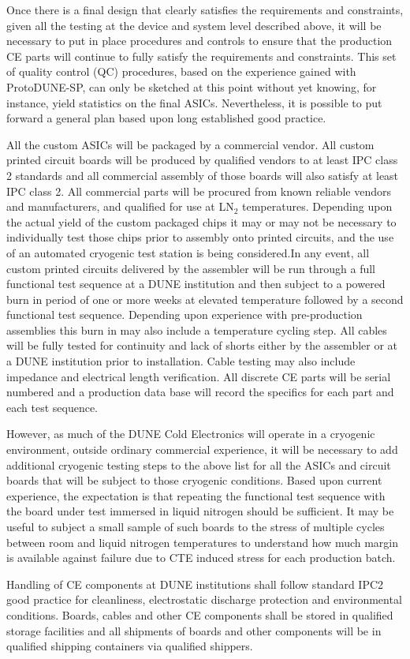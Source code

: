Once there is a final design that clearly satisfies the requirements and constraints, given all the testing at the device and system level described above, it will be necessary to put in place procedures and controls to ensure that the production CE parts will continue to fully satisfy the requirements and constraints. This set of quality control (QC) procedures, based on the experience gained with ProtoDUNE-SP, can only be sketched at this point without yet knowing, for instance, yield statistics on the final ASICs. Nevertheless, it is possible to put forward a general plan based upon long established good practice.

All the custom ASICs will be packaged by a commercial vendor. All custom printed circuit boards will be produced by qualified vendors to at least IPC class 2 standards and all commercial assembly of those boards will also satisfy at least IPC class 2. All commercial parts will be procured from known reliable vendors and manufacturers, and qualified for use at LN$_2$ temperatures. Depending upon the actual yield of the custom packaged chips it may or may not be necessary to individually test those chips prior to assembly onto printed circuits, and the use of an automated cryogenic test station is being considered.In any event, all custom printed circuits delivered by the assembler will be run through a full functional test sequence at a DUNE institution and then subject to a powered burn in period of one or more weeks at elevated temperature followed by a second functional test sequence. Depending upon experience with pre-production assemblies this burn in may also include a temperature cycling step. All cables will be fully tested for continuity and lack of shorts either by the assembler or at a DUNE institution prior to installation. Cable testing may also include impedance and electrical length verification. All discrete CE parts will be serial numbered and a production data base will record the specifics for each part and each test sequence.

However, as much of the DUNE Cold Electronics will operate in a cryogenic environment, outside ordinary commercial experience, it will be necessary to add additional cryogenic testing steps to the above list for all the ASICs and circuit boards that will be subject to those cryogenic conditions. Based upon current experience, the expectation is that repeating the functional test sequence with the board under test immersed in liquid nitrogen should be sufficient. It may be useful to subject a small sample of such boards to the stress of multiple cycles between room and liquid nitrogen temperatures to understand how much margin is available against failure due to CTE induced stress for each production batch.

Handling of CE components at DUNE institutions shall follow standard IPC2 good practice for cleanliness, electrostatic discharge protection and environmental conditions. Boards, cables and other CE components shall be stored in qualified storage facilities and all shipments of boards and other components will be in qualified shipping containers via qualified shippers.
